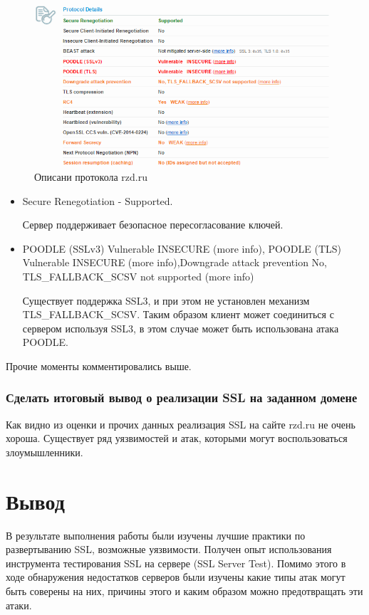 \documentclass[11pt, a4paper]{article}		%
\begin{document}
\begin{figure}[h!]
\centering
\includegraphics[scale=0.8]{res/protocol_details_rzd}
\caption{Описани протокола rzd.ru}
\end{figure}

\begin{itemize}

\item Secure Renegotiation - Supported.

Сервер поддерживает безопасное пересогласование ключей.

\item POODLE (SSLv3)	Vulnerable   INSECURE (more info), POODLE (TLS)	Vulnerable   INSECURE (more info),Downgrade attack prevention	No, TLS\_FALLBACK\_SCSV not supported (more info)

Существует поддержка SSL3, и при этом не установлен механизм TLS\_FALLBACK\_SCSV. Таким образом клиент может соединиться с сервером используя SSL3, в этом случае может быть использована атака POODLE.

\end{itemize}

Прочие моменты комментировались выше.


\subsubsection{Сделать итоговый вывод о реализации SSL на заданном домене}

Как видно из оценки и прочих данных реализация SSL на сайте rzd.ru не очень хороша. Существует ряд уязвимостей и атак, которыми могут воспользоваться злоумышленники.


\section{Вывод}

В результате выполнения работы были изучены лучшие практики по развертыванию SSL, возможные уязвимости. Получен опыт использования инструмента тестирования SSL на сервере (SSL Server Test). Помимо этого в ходе обнаружения недостатков серверов были изучены какие типы атак могут быть соверены на них, причины этого и каким образом можно предотвращать эти атаки.
\end{document}
